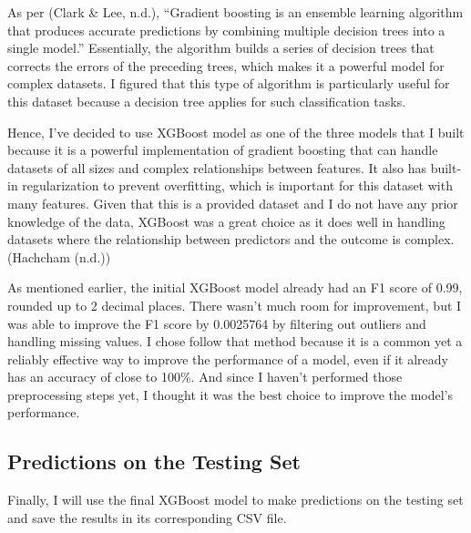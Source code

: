 \documentclass[
]{article}
\begin{document}
As per (Clark \& Lee, n.d.), ``Gradient boosting is an ensemble learning
algorithm that produces accurate predictions by combining multiple
decision trees into a single model.'' Essentially, the algorithm builds
a series of decision trees that corrects the errors of the preceding
trees, which makes it a powerful model for complex datasets. I figured
that this type of algorithm is particularly useful for this dataset
because a decision tree applies for such classification tasks.

Hence, I've decided to use XGBoost model as one of the three models that
I built because it is a powerful implementation of gradient boosting
that can handle datasets of all sizes and complex relationships between
features. It also has built-in regularization to prevent overfitting,
which is important for this dataset with many features. Given that this
is a provided dataset and I do not have any prior knowledge of the data,
XGBoost was a great choice as it does well in handling datasets where
the relationship between predictors and the outcome is complex.
(Hachcham (n.d.))

As mentioned earlier, the initial XGBoost model already had an F1 score
of 0.99, rounded up to 2 decimal places. There wasn't much room for
improvement, but I was able to improve the F1 score by 0.0025764 by
filtering out outliers and handling missing values. I chose follow that
method because it is a common yet a reliably effective way to improve
the performance of a model, even if it already has an accuracy of close
to 100\%. And since I haven't performed those preprocessing steps yet, I
thought it was the best choice to improve the model's performance.

\subsection{Predictions on the Testing
Set}\label{predictions-on-the-testing-set}

Finally, I will use the final XGBoost model to make predictions on the
testing set and save the results in its corresponding CSV file.
\end{document}
